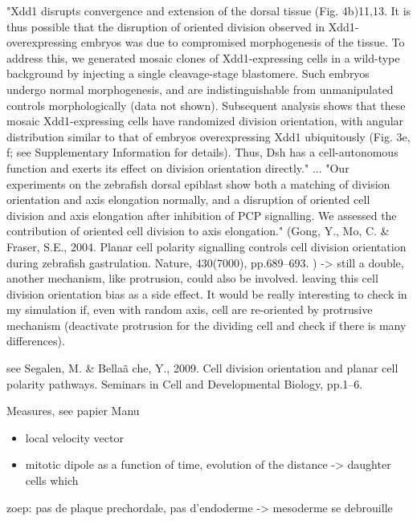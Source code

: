    "Xdd1 disrupts convergence and extension of the dorsal tissue (Fig. 4b)11,13. It is thus possible that the disruption of oriented division observed in Xdd1-overexpressing embryos was due to compromised morphogenesis of the tissue. To address this, we generated mosaic clones of Xdd1-expressing cells in a wild-type background by injecting a single cleavage-stage blastomere. Such embryos undergo normal morphogenesis, and are indistinguishable from unmanipulated controls morphologically (data not shown). Subsequent analysis shows that these mosaic Xdd1-expressing cells have randomized division orientation, with angular distribution similar to that of embryos overexpressing Xdd1 ubiquitously (Fig. 3e, f; see Supplementary Information for details). Thus, Dsh has a cell-autonomous function and exerts its effect on division orientation directly." ... "Our experiments on the zebrafish dorsal epiblast show both a matching of division orientation and axis elongation normally, and a disruption of oriented cell division and axis elongation after inhibition of PCP signalling. We assessed the contribution of oriented cell division to axis elongation." (Gong, Y., Mo, C. \& Fraser, S.E., 2004. Planar cell polarity signalling controls cell division orientation during zebrafish gastrulation. Nature, 430(7000), pp.689–693. \cite{Gong:2004bw}) -> still a double, another mechanism, like protrusion, could also be involved. leaving this cell division orientation bias as a side effect. It would be really interesting to check in my simulation if, even with random axis, cell are re-oriented by protrusive mechanism (deactivate protrusion for the dividing cell and check if there is many differences).  

   see Segalen, M. \& Bellaã che, Y., 2009. Cell division orientation and planar cell polarity pathways. Seminars in Cell and Developmental Biology, pp.1–6. \cite{Segalen:2009fg}

  Measures, see papier Manu 
\begin{itemize}
	\item local velocity vector
	\item mitotic dipole as a function of time, evolution of the distance -> daughter cells which 
\end{itemize}    zoep: pas de plaque prechordale, pas d'endoderme -> mesoderme se debrouille    

